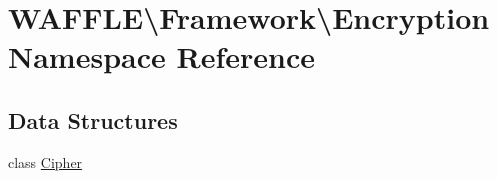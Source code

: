 \hypertarget{namespace_w_a_f_f_l_e_1_1_framework_1_1_encryption}{}\section{W\+A\+F\+F\+LE\textbackslash{}Framework\textbackslash{}Encryption Namespace Reference}
\label{namespace_w_a_f_f_l_e_1_1_framework_1_1_encryption}
\subsection*{Data Structures}
\begin{DoxyCompactItemize}
\item 
class \hyperlink{class_w_a_f_f_l_e_1_1_framework_1_1_encryption_1_1_cipher}{Cipher}
\end{DoxyCompactItemize}
